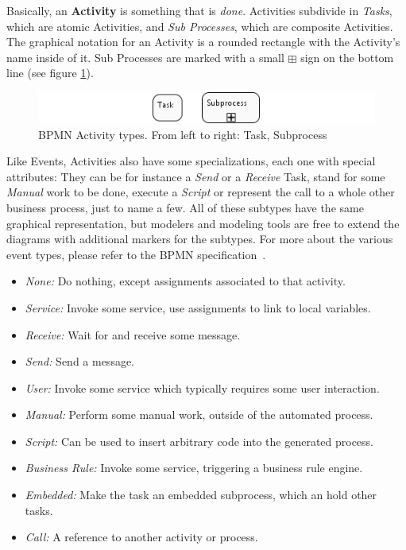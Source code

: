 Basically, an \textbf{Activity} is something that is \emph{done}.  Activities
subdivide in \emph{Tasks}, which are atomic Activities, and \emph{Sub Processes},
which are composite Activities.  The graphical notation for an Activity is a
rounded rectangle with the Activity's name inside of it.  Sub Processes are marked
with a small $ \boxplus $ sign on the bottom line (see figure \ref{fig:activities}).

\begin{figure}[ht]
	\centering
	\includegraphics[width=.75\textwidth]{figures/bpmn/activities.png}
	\caption[BPMN Activity types]{BPMN Activity types.  From left to right: Task,
	Subprocess}
	\label{fig:activities}
\end{figure}

Like Events, Activities also have some specializations, each one with special
attributes: They can be for instance a \emph{Send} or a \emph{Receive} Task, stand
for some \emph{Manual} work to be done, execute a \emph{Script} or represent the
call to a whole other business process, just to name a few.  All of these subtypes
have the same graphical representation, but modelers and modeling tools are free
to extend the diagrams with additional markers for the subtypes.  For more about
the various event types, please refer to the BPMN specification~\cite{omg2011bpmn2}.

\begin{itemize}
	\item \emph{None:} Do nothing, except assignments associated to that activity.
	\item \emph{Service:} Invoke some service, use assignments to link to local variables.
	\item \emph{Receive:} Wait for and receive some message.
	\item \emph{Send:} Send a message.
	\item \emph{User:} Invoke some service which typically requires some user interaction.
	\item \emph{Manual:} Perform some manual work, outside of the automated process.
	\item \emph{Script:} Can be used to insert arbitrary code into the generated process.
	\item \emph{Business Rule:} Invoke some service, triggering a business rule engine.
	\item \emph{Embedded:} Make the task an embedded subprocess, which an hold other tasks.
	\item \emph{Call:} A reference to another activity or process.
\end{itemize}


